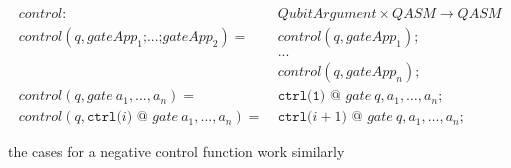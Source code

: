 \begin{align*}
    control : \ & QubitArgument \times QASM \to QASM\\
    control(q, gateApp_1\texttt{;} ...\texttt{;} gateApp_2) = \ & control(q, gateApp_1)\texttt{;}\\
        & ...\\
        & control(q, gateApp_n)\texttt{;}\\
    control(q, gate \ a_1, \dots, a_n ) = \ & \texttt{ctrl(1) @ } gate \ q, a_1, \dots, a_n\texttt{;}\\
    control(q, \texttt{ctrl(}i \texttt{) @ } gate \ a_1, \dots, a_n ) = \ & \texttt{ctrl(}i+1 \texttt{) @ } gate \ q, a_1, \dots, a_n\texttt{;}
\end{align*}

the cases for a negative control function work similarly